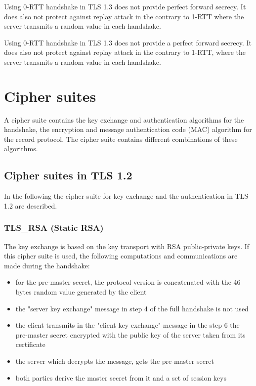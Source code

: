 Using 0-RTT handshake in TLS 1.3 does not provide perfect forward secrecy. It does also not protect against replay attack in the contrary to 1-RTT where the server transmits a random value in each handshake.

Using 0-RTT handshake in TLS 1.3 does not provide a perfect forward secrecy. It does also not protect against replay attack in the contrary to 1-RTT, where the server transmits a random value in each handshake.
\cite{recorla}

\section{Cipher suites}
\label{sec:comparison_ciphersuits}

A cipher suite contains the key exchange and authentication algorithms for the handshake, the encryption and message authentication code (MAC) algorithm for the record protocol. The cipher suite contains different combinations of these algorithms.

\subsection{Cipher suites in TLS 1.2}
\label{subsec:ciphersuits1_2}

In the following the cipher suite for key exchange and the authentication in TLS 1.2 are described.

\subsubsection*{TLS\_RSA (Static RSA)} 
The key exchange is based on the key transport with RSA public-private keys.
If this cipher suite is used, the following computations and communications are made during the handshake:
\begin{itemize}
	\item for the pre-master secret, the protocol version is concatenated with the 46 bytes random value generated by the client
	\item the "server key exchange" message in step 4 of the full handshake is not used
	\item the client transmits in the "client key exchange" message in the step 6 the pre-master secret encrypted with the public key of the server taken from its certificate
	\item the server which decrypts the message, gets the pre-master secret 
	\item both parties derive the master secret from it and a set of session keys
\end{itemize}

